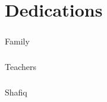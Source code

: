 \documentclass[../main.tex]{subfile}
\begin{document}
\chapter*{Dedications}
\paragraph{} Family
\paragraph{} Teachers
\paragraph{} Shafiq
\end{document}
